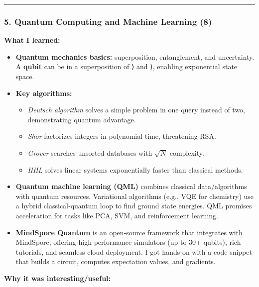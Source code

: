 \begin{center}\rule{0.5\linewidth}{0.5pt}\end{center}

\hypertarget{quantum-computing-and-machine-learning-8}{%
\subsubsection{5. Quantum Computing and Machine Learning
(8)}\label{quantum-computing-and-machine-learning-8}}

\textbf{What I learned:}

\begin{itemize}
\tightlist
\item
  \textbf{Quantum mechanics basics:} superposition, entanglement, and
  uncertainty. A \textbf{qubit} can be in a superposition of ⟩
  and ⟩, enabling exponential state space.
\item
  \textbf{Key algorithms:}

  \begin{itemize}
  \tightlist
  \item
    \emph{Deutsch algorithm} solves a simple problem in one query
    instead of two, demonstrating quantum advantage.
  \item
    \emph{Shor} factorizes integers in polynomial time, threatening RSA.
  \item
    \emph{Grover} searches unsorted databases with $\sqrt{N}$ complexity.
  \item
    \emph{HHL} solves linear systems exponentially faster than classical
    methods.
  \end{itemize}
\item
  \textbf{Quantum machine learning (QML)} combines classical
  data/algorithms with quantum resources. Variational algorithms (e.g.,
  VQE for chemistry) use a hybrid classical‑quantum loop to find ground
  state energies. QML promises acceleration for tasks like PCA, SVM, and
  reinforcement learning.
\item
  \textbf{MindSpore Quantum} is an open‑source framework that integrates
  with MindSpore, offering high‑performance simulators (up to 30+
  qubits), rich tutorials, and seamless cloud deployment. I got hands‑on
  with a code snippet that builds a circuit, computes expectation
  values, and gradients.
\end{itemize}

\textbf{Why it was interesting/useful:}


